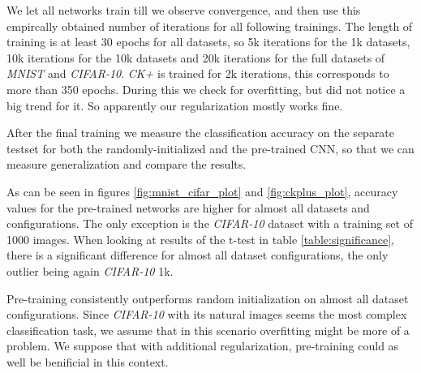 \documentclass{article}
\begin{document}
    We let all networks train till we observe convergence, and then use this empircally obtained number of iterations for all following trainings.
    The length of training is at least 30 epochs for all datasets, so 5k iterations for the 1k datasets, 10k iterations for the 10k datasets and 20k iterations for the full datasets of \emph{MNIST} and \emph{CIFAR-10}.
    \emph{CK+} is trained for 2k iterations, this corresponds to more than 350 epochs.
    During this we check for overfitting, but did not notice a big trend for it.
    So apparently our regularization mostly works fine.

    After the final training we measure the classification accuracy on the separate testset for both the randomly-initialized and the pre-trained CNN, so that we can measure generalization and compare the results.

    As can be seen in figures \ref{fig:mnist_cifar_plot} and \ref{fig:ckplus_plot}, accuracy values for the pre-trained networks are higher for almost all datasets and configurations. The only exception is the \emph{CIFAR-10} dataset with a training set of 1000 images. When looking at results of the t-test in table \ref{table:significance}, there is a significant difference for almost all dataset configurations, the only outlier being again \emph{CIFAR-10} 1k. 
    
    Pre-training consistently outperforms random initialization on almost all dataset configurations. Since \emph{CIFAR-10} with its natural images seems the most complex classification task, we assume that in this scenario overfitting might be more of a problem. We suppose that with additional regularization, pre-training could as well be benificial in this context. 
\end{document}
